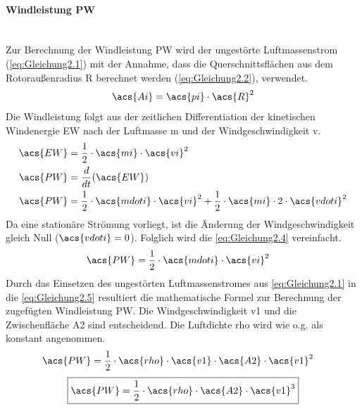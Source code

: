 \paragraph{Windleistung \acs{PW}}\mbox{}\smallskip\\
Zur Berechnung der Windleistung \acs{PW} wird der ungestörte Luftmassenstrom (\autoref{eq:Gleichung2.1}) mit der Annahme, dass die Querschnittsflächen aus dem Rotoraußenradius \acs{R} berechnet werden (\autoref{eq:Gleichung2.2}), verwendet.
\begin{align}
    \acs{Ai} = \acs{pi}\cdot \acs{R}^2
    \label{eq:Gleichung2.2}
\end{align}
\newline
Die Windleistung folgt aus der zeitlichen Differentiation der kinetischen Windenergie \acs{EW} nach der Luftmasse \acs{m} und der Windgeschwindigkeit \acs{v}. 
\begin{align}
    \acs{EW} &= \frac{1}{2} \cdot \acs{mi} \cdot \acs{vi}^2 \nonumber \\
    \acs{PW} &= \frac{d}{dt}(\acs{EW}) \label{eq:Gleichung2.3} \\
    \acs{PW} &= \frac{1}{2} \cdot \acs{mdoti} \cdot \acs{vi}^2 + \frac{1}{2} \cdot \acs{mi} \cdot 2 \cdot \acs{vdoti}^2 \label{eq:Gleichung2.4}
\end{align}
\newline
Da eine stationäre Strömung vorliegt, ist die Änderung der Windgeschwindigkeit gleich Null ($\acs{vdoti} = 0$). Folglich wird die \autoref{eq:Gleichung2.4} vereinfacht.
\begin{align}
    \acs{PW} &= \frac{1}{2} \cdot \acs{mdoti} \cdot \acs{vi}^2 \label{eq:Gleichung2.5}
\end{align}
\newline
Durch das Einsetzen des ungestörten Luftmassenstromes aus \autoref{eq:Gleichung2.1} in die \autoref{eq:Gleichung2.5} resultiert die mathematische Formel zur Berechnung der zugefügten Windleistung \acs{PW}. Die Windgeschwindigkeit \acs{v1} und die Zwischenfläche \acs{A2} sind entscheidend. Die Luftdichte \acs{rho} wird wie o.g. als konstant angenommen.
\begin{align*}
    \acs{PW} &= \frac{1}{2} \cdot \acs{rho} \cdot \acs{v1} \cdot \acs{A2} \cdot \acs{v1}^2
\end{align*}
\begin{equation}\label{eq:Gleichung2.6}
    \boxed{\acs{PW} = \frac{1}{2} \cdot \acs{rho} \cdot \acs{A2} \cdot \acs{v1}^3} 
\end{equation}

